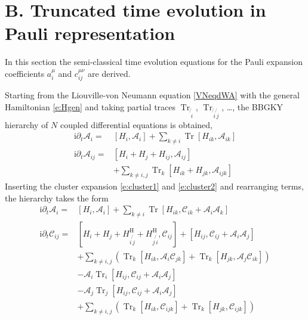 \documentclass[aps,prl,showpacs,amsmath,amssymb,superscriptaddress,reprint,10pt]{revtex4-1}
\newcommand\ii{{\mathrm{i}}}
\newcommand{\Com}[2]{\left[{#1},{#2}\right]}
\DeclareMathOperator{\Tr}{{Tr}}
\begin{document}
\section{B. Truncated time evolution in Pauli representation}
\setcounter{section}{2}
\setcounter{equation}{0}
\setcounter{figure}{0}

In this section the semi-classical time evolution equations for the Pauli expansion coefficients $a_i^\mu$ and $c_{ij}^{\mu\nu}$ are derived.

Starting from the Liouville-von Neumann equation \eqref{VNeqdWA} with the general Hamiltonian \eqref{e:Hgen} and taking partial traces $\Tr_{\not{\,i}}$, $\Tr_{\not{\,i}\not{\,j}}$, \dots, the BBGKY hierarchy of $N$ coupled differential equations is obtained,
\begin{subequations}
\begin{align}
\ii\partial_t \mathscr{A}_i=&\Com{H_i}{\mathscr{A}_i}+\sum_{k\neq i}\Tr\Com{H_{ik}}{\mathscr{A}_{ik}}\label{e:1st_order_app1}\\
\ii\partial_t \mathscr{A}_{ij}=&\Com{H_i+H_j+H_{ij}}{\mathscr{A}_{ij}}\nonumber\\
&+\sum_{k\neq i,j}\Tr_k\Com{H_{ik}+H_{jk}}{\mathscr{A}_{ijk}}
\label{e:2nd_order_app1}
\end{align}
\end{subequations}
Inserting the cluster expansion \eqref{e:cluster1} and \eqref{e:cluster2} and rearranging terms, the hierarchy takes the form 
\begin{subequations}
\begin{align}
\ii\partial_t \mathscr{A}_i=&\Com{H_i}{\mathscr{A}_i}+\sum_{k\neq i}\Tr\Com{H_{ik}}{\mathscr{C}_{ik}+\mathscr{A}_i \mathscr{A}_k}\label{e:1st_order_app2}\\
\ii\partial_t \mathscr{C}_{ij}=&\Com{H_i+H_j+H_{i\not{\,j}}^\text{H}+H_{j\not{\,i}}^\text{H}}{\mathscr{C}_{ij}}+\Com{H_{ij}}{\mathscr{C}_{ij}+\mathscr{A}_i \mathscr{A}_j}\nonumber\\
&+\sum_{k\neq i,j}\left(\Tr_k\Com{H_{ik}}{\mathscr{A}_i \mathscr{C}_{jk}}+\Tr_k\Com{H_{jk}}{\mathscr{A}_j \mathscr{C}_{ik}}\right)\nonumber\\
&-\mathscr{A}_i\Tr_i\Com{H_{ij}}{\mathscr{C}_{ij}+\mathscr{A}_i \mathscr{A}_j}\nonumber\\
&-\mathscr{A}_j\Tr_j\Com{H_{ij}}{\mathscr{C}_{ij}+\mathscr{A}_i \mathscr{A}_j}\nonumber\\
&+\sum_{k\neq i,j}\left(\Tr_k\Com{H_{ik}}{\mathscr{C}_{ijk}}+\Tr_k\Com{H_{jk}}{\mathscr{C}_{ijk}}\right)
\label{e:2nd_order_app2}
\end{align}
\end{subequations}
\end{document}
